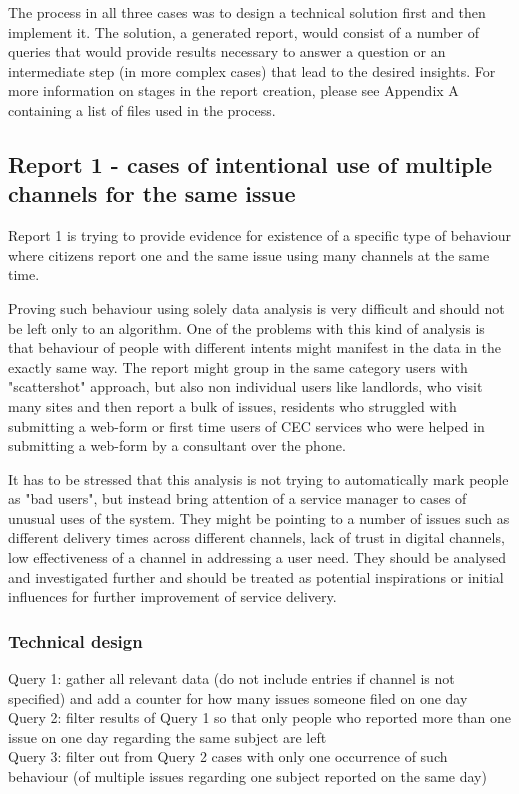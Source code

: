 The process in all three cases was to design a technical solution first and then implement it. The solution, a generated report, would consist of a number of queries that would provide results necessary to answer a question or an intermediate step (in more complex cases) that lead to the desired insights. For more information on stages in the report creation, please see Appendix A containing a list of files used in the process.
	
		\subsection{Report 1 - cases of intentional use of multiple channels for the same issue}
		
Report 1 is trying to provide evidence for existence of a specific type of behaviour where citizens report one and the same issue using many channels at the same time.

Proving such behaviour using solely data analysis is very difficult and should not be left only to an algorithm. One of the problems with this kind of analysis is that behaviour of people with different intents might manifest in the data in the exactly same way. The report might group in the same category users with "scattershot" approach, but also non individual users like landlords, who visit many sites and then report a bulk of issues, residents who struggled with submitting a web-form or first time users of CEC services who were helped in submitting a web-form by a consultant over the phone.

It has to be stressed that this analysis is not trying to automatically mark people as "bad users", but instead bring attention of a service manager to cases of unusual uses of the system. They might be pointing to a number of issues such as different delivery times across different channels, lack of trust in digital channels, low effectiveness of a channel in addressing a user need. They should be analysed and investigated further and should be treated as potential inspirations or initial influences for further improvement of service delivery.

			\subsubsection{Technical design}
Query 1: gather all relevant data (do not include entries if channel is not specified) and add a counter for how many issues someone filed on one day\\
Query 2: filter results of Query 1 so that only people who reported more than one issue on one day regarding the same subject are left\\
Query 3: filter out from Query 2 cases with only one occurrence of such behaviour (of multiple issues regarding one subject reported on the same day)

